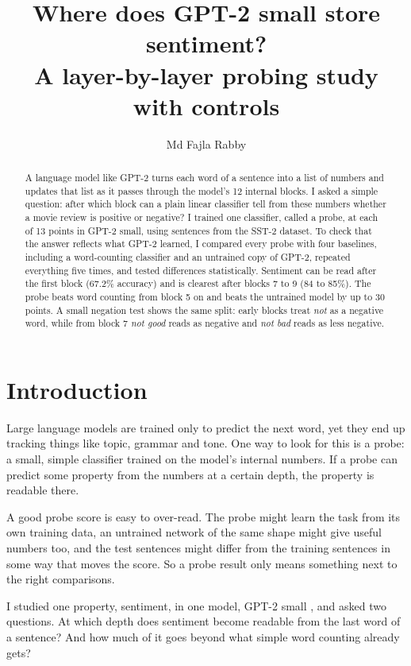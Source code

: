 \documentclass[10pt,twocolumn]{article}
\title{\vspace{-1.5em}\Large Where does GPT-2 small store sentiment?\\A layer-by-layer probing study with controls}
\author{Md Fajla Rabby}
\date{\vspace{-2em}}
\begin{document}
\maketitle

\begin{abstract}
A language model like GPT-2 turns each word of a sentence into a list of numbers and updates that list as it passes through the model's 12 internal blocks. I asked a simple question: after which block can a plain linear classifier tell from these numbers whether a movie review is positive or negative? I trained one classifier, called a probe, at each of 13 points in GPT-2 small, using sentences from the SST-2 dataset. To check that the answer reflects what GPT-2 learned, I compared every probe with four baselines, including a word-counting classifier and an untrained copy of GPT-2, repeated everything five times, and tested differences statistically. Sentiment can be read after the first block (67.2\% accuracy) and is clearest after blocks 7 to 9 (84 to 85\%). The probe beats word counting from block 5 on and beats the untrained model by up to 30 points. A small negation test shows the same split: early blocks treat \textit{not} as a negative word, while from block 7 \textit{not good} reads as negative and \textit{not bad} reads as less negative.
\end{abstract}

\section{Introduction}

Large language models are trained only to predict the next word, yet they end up tracking things like topic, grammar and tone. One way to look for this is a probe: a small, simple classifier trained on the model's internal numbers. If a probe can predict some property from the numbers at a certain depth, the property is readable there.

A good probe score is easy to over-read. The probe might learn the task from its own training data, an untrained network of the same shape might give useful numbers too, and the test sentences might differ from the training sentences in some way that moves the score. So a probe result only means something next to the right comparisons.

I studied one property, sentiment, in one model, GPT-2 small \citep{radford2019language}, and asked two questions. At which depth does sentiment become readable from the last word of a sentence? And how much of it goes beyond what simple word counting already gets?
\end{document}
